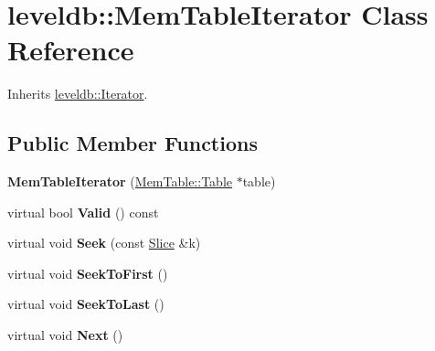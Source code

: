 \hypertarget{classleveldb_1_1_mem_table_iterator}{}\section{leveldb\+::Mem\+Table\+Iterator Class Reference}
\label{classleveldb_1_1_mem_table_iterator}


Inherits \mbox{\hyperlink{classleveldb_1_1_iterator}{leveldb\+::\+Iterator}}.

\subsection*{Public Member Functions}
\begin{DoxyCompactItemize}
\item 
\mbox{\label{classleveldb_1_1_mem_table_iterator_a3cf243a6e8166d55ce87081f69a5ecd7}} 
{\bfseries Mem\+Table\+Iterator} (\mbox{\hyperlink{classleveldb_1_1_skip_list}{Mem\+Table\+::\+Table}} $\ast$table)
\item 
\mbox{\label{classleveldb_1_1_mem_table_iterator_ab991decbbda3c3c76dbc1e3cce446b90}} 
virtual bool {\bfseries Valid} () const
\item 
\mbox{\label{classleveldb_1_1_mem_table_iterator_a140f9575286994337de9b49ea7fe62cb}} 
virtual void {\bfseries Seek} (const \mbox{\hyperlink{classleveldb_1_1_slice}{Slice}} \&k)
\item 
\mbox{\label{classleveldb_1_1_mem_table_iterator_a72eaf5c1bcb6d513f71d4edcb8db3f98}} 
virtual void {\bfseries Seek\+To\+First} ()
\item 
\mbox{\label{classleveldb_1_1_mem_table_iterator_aaed044dc887a51c924086f2a2844a5f0}} 
virtual void {\bfseries Seek\+To\+Last} ()
\item 
\mbox{\label{classleveldb_1_1_mem_table_iterator_a8ce5457cf61b989ce1ceec80084f891c}} 
virtual void {\bfseries Next} ()
\item 
\mbox{\label{classleveldb_1_1_mem_table_iterator_a61f8a385b268158a1e7bd0cba29a83c1}} 

\end{DoxyCompactItemize}
